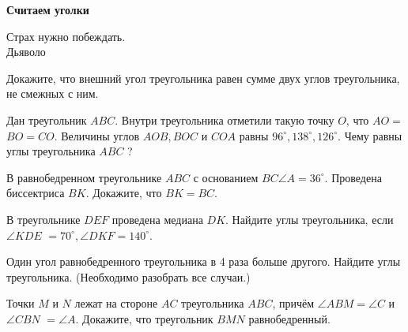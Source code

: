\centerline{\bf \Huge Считаем уголки}

\begin{flushright}
        \scriptsize{Страх нужно побеждать.\\Дьяволо}
\end{flushright}

Докажите, что внешний угол треугольника равен сумме двух углов треугольника, не смежных с ним.

Дан треугольник $A B C$. Внутри треугольника отметили такую точку $O$, что $A O=$ $B O=C O$. Величины углов $A O B, B O C$ и $C O A$ равны $96^{\circ}, 138^{\circ}, 126^{\circ}$. Чему равны углы треугольника $A B C$ ?

В равнобедренном треугольнике $A B C$ с основанием $B C \angle A=36^{\circ}$. Проведена биссектриса $B K$. Докажите, что $B K=B C$.

В треугольнике $D E F$ проведена медиана $D K$. Найдите углы треугольника, если $\angle K D E$ $=70^{\circ}, \angle D K F=140^{\circ}$.

Один угол равнобедренного треугольника в 4 раза больше другого. Найдите углы треугольника. (Необходимо разобрать все случаи.)

Точки $M$ и $N$ лежат на стороне $A C$ треугольника $A B C$, причём $\angle A B M=\angle C$ и $\angle C B N$ $=\angle A$. Докажите, что треугольник $B M N$ равнобедренный.